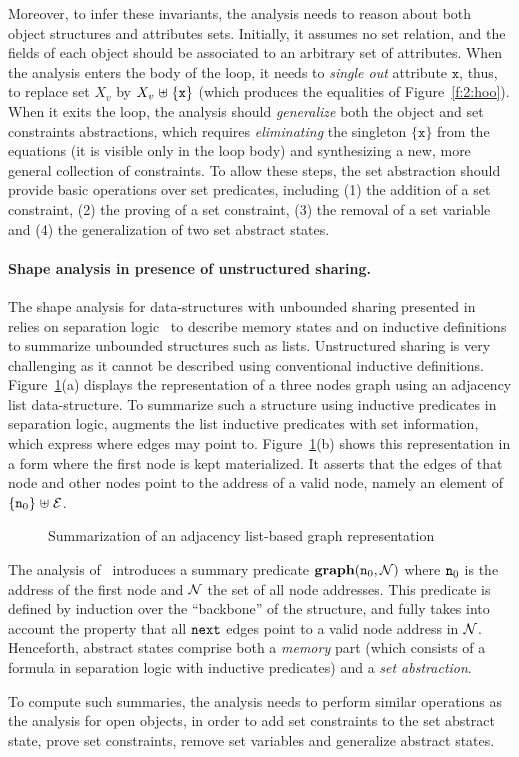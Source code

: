 Moreover, to infer these invariants, the analysis needs to reason
about both object structures and attributes sets.
Initially, it assumes no set relation, and the fields of
each object should be associated to an arbitrary set of attributes.
When the analysis enters the body of the loop, it needs to
{\em single out} attribute \( \mathtt{x} \), thus, to replace set
\( X_v \) by \( X_v \mathrel{\uplus} \{ \mathtt{x} \} \) (which produces the
equalities of Figure~\ref{f:2:hoo}).
When it exits the loop, the analysis should {\em generalize}
both the object and set constraints abstractions, which requires
{\em eliminating} the singleton \( \{ \mathtt{x} \} \) from the
equations (it is visible only in the loop body) and synthesizing
a new, more general collection of constraints.
To allow these steps, the set abstraction should provide basic operations
over set predicates, including (1) the addition of a set constraint, (2)
the proving of a set constraint, (3) the removal of a set variable and
(4) the generalization of two set abstract states.

\paragraph{Shape analysis in presence of unstructured sharing.}
The shape analysis for data-structures with unbounded sharing presented
in~\cite{memcad:15:sas} relies on separation logic~\cite{r:lics:02} to
describe memory states and on inductive definitions to summarize
unbounded structures such as lists.
Unstructured sharing is very challenging as it cannot be described using
conventional inductive definitions.
Figure~\ref{f:3:memcad}(a) displays the representation of a three nodes
graph using an adjacency list data-structure.
To summarize such a structure using inductive predicates in separation
logic, \cite{memcad:15:sas} augments the list inductive
predicates with set information, which express where edges may point to.
Figure~\ref{f:3:memcad}(b) shows this representation in
a form where the first node is kept materialized.
It asserts that the edges of that node and other nodes
point to the address of a valid node, namely an element of \( \{ \texttt{n}_{0}
\} \mathrel{\uplus} \mathcal{E} \).
\begin{figure}[t]
  \newcommand{\picscale}{0.9}
  \begin{center}
    \tikzpics{\picscale}{memcad-inv}
  \end{center}
  \caption{Summarization of an adjacency list-based graph representation}
  \label{f:3:memcad}
\end{figure}
The analysis of~\cite{memcad:15:sas} introduces a summary predicate
\( \textbf{graph}( \texttt{n}_{0}, \mathcal{N} ) \) where \( \texttt{n}_{0} \) is the
address of the first node and \( \mathcal{N} \) the set of all node addresses.
This predicate is defined by induction over the ``backbone'' of the
structure, and fully takes into account the property that all
\( \mathtt{next} \) edges point to a valid node address in \( \mathcal{N} \).
Henceforth, abstract states comprise both a {\em memory} part (which
consists of a formula in separation logic with inductive predicates)
and a {\em set abstraction}.

To compute such summaries, the analysis needs to perform similar
operations as the analysis for open objects, in order to add set
constraints to the set abstract state, prove set constraints,
remove set variables and generalize abstract states.
